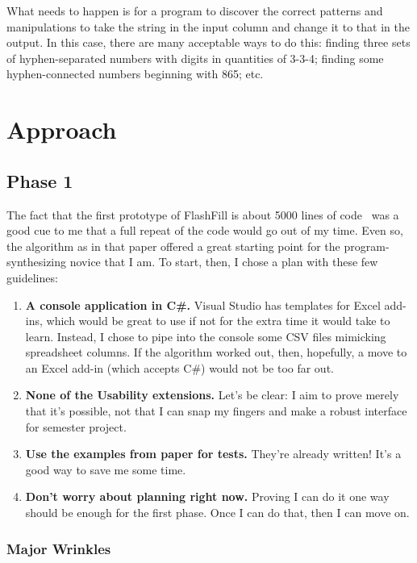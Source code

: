 \documentclass[11pt]{article} \usepackage{cite} \usepackage{marginnote}
\begin{document}
	What needs to happen is for a program to discover the correct patterns and
	manipulations to take the string in the input column and change it to that in
	the output. In this case, there are many acceptable ways to do this: finding
	three sets of hyphen-separated numbers with digits in quantities of 3-3-4;
	finding some hyphen-connected numbers beginning with 865; etc.
	
	\section{Approach} \subsection{Phase 1} The fact that the first prototype of
	FlashFill is about 5000 lines of code~\cite{gulwani2011automating} was a good
	cue to me that a full repeat of the code would go out of my time. Even so, the
	algorithm as in that paper offered a great starting point for the
	program-synthesizing novice that I am. To start, then, I chose a plan with
	these few guidelines:
	
	\begin{enumerate}
		
		\item \textbf{A console application in C\#.} Visual Studio has templates for
		Excel add-ins, which would be great to use if not for the extra time it would
		take to learn. Instead, I chose to pipe into the console some CSV files
		mimicking spreadsheet columns. If the algorithm worked out, then, hopefully,
		a move to an Excel add-in (which accepts C\#) would not be too far out.
		
		\item \textbf{None of the Usability extensions.} Let's be clear: I aim to
		prove merely that it's possible, not that I can snap my fingers and make a
		robust interface for semester project.
		
		\item \textbf{Use the examples from paper for tests.} They're already
		written! It's a good way to save me some time.
		
		\item \textbf{Don't worry about planning right now.} Proving I can do it one
		way should be enough for the first phase. Once I can do that, then I can move
		on.
		
	\end{enumerate}
	
	\subsubsection{Major Wrinkles}
	
\end{document}
